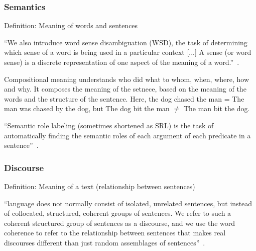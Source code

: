 \documentclass[11pt]{article}
\begin{document}

\subsubsection{Semantics}

Definition: Meaning of words and sentences

``We also introduce word sense disambiguation (WSD), the task of determining which sense of a word is being used in a particular context [...] A sense (or word sense) is a discrete representation of one aspect of the meaning of a word.''~\cite{book-speech-and-language-processing}.

Compositional meaning understands who did what to whom, when, where, how and why. It composes the meaning of the setnece, based on the meaning of the words and the structure of the sentence. Here, the dog chased the man = The man was chased by the dog, but The dog bit the man $\neq$ The man bit the dog.

``Semantic role labeling (sometimes shortened as SRL) is the task of automatically finding the semantic roles of each argument of each predicate in a sentence''~\cite{book-speech-and-language-processing}.

\subsubsection{Discourse}

Definition: Meaning of a text (relationship between sentences)

``language does not normally consist of isolated, unrelated sentences, but instead of collocated, structured, coherent groups of sentences. We refer to such a coherent structured group of sentences as a discourse, and we use the word coherence to refer to the relationship between sentences that makes real discourses different than just random assemblages of sentences''~\cite{book-speech-and-language-processing}.
\end{document}
